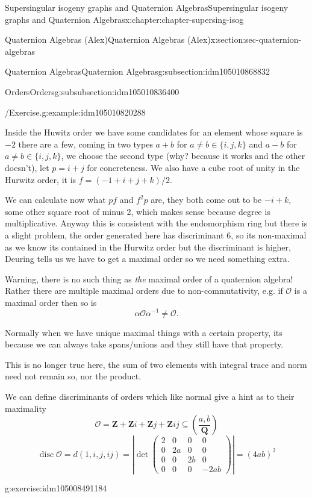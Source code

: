 \documentclass[oneside,10pt,]{book}
\numberwithin{equation}{section}
\newcommand{\inv}{^{-1}}
\newcommand{\legendre}[2]{\left(\frac{#1}{#2}\right)}
\newcommand{\ZZ}{\mathbf{Z}}
\newcommand{\QQ}{\mathbf{Q}}
\newcommand{\ints}{\mathcal{O}}
\DeclareMathOperator{\disc}{disc}
\newcommand{\amp}{&}
\begin{document}
\begin{chapterptx}{Supersingular isogeny graphs and Quaternion Algebras}{}{Supersingular isogeny graphs and Quaternion Algebras}{}{}{x:chapter:chapter-supersing-isog}
\begin{sectionptx}{Quaternion Algebras (Alex)}{}{Quaternion Algebras (Alex)}{}{}{x:section:sec-quaternion-algebras}
\begin{subsectionptx}{Quaternion Algebras}{}{Quaternion Algebras}{}{}{g:subsection:idm105010868832}
\begin{subsubsectionptx}{Orders}{}{Orders}{}{}{g:subsubsection:idm105010836400}
\begin{example}{\slash{}Exercise.}{g:example:idm105010820288}
\par
Inside the Huwitz order we have some candidates for an element whose square is \(-2\) there are a few, coming in two types \(a+ b\) for \(a \ne b \in \{i,j,k\}\) and \(a-b\) for \(a\ne b\in \{i,j,k\}\), we choose the second type (why? because it works and the other doesn't), let \(p = i + j\) for concreteness. We also have a cube root of unity in the Hurwitz order, it is \(f = (-1 + i + j + k)/2\).%
\par
We can calculate now what \(pf\) and \(f^2 p\) are, they both come out to be \(- i + k\), some other square root of minus 2, which makes sense because degree is multiplicative. Anyway this is consistent with the endomorphism ring but there is a slight problem, the order generated here has discriminant \(6\), so its non-maximal as we know its contained in the Hurwitz order but the discriminant is higher, Deuring tells us we have to get a maximal order so we need something extra.%
\end{example}
Warning, there is no such thing as \emph{the} maximal order of a quaternion algebra! Rather there are multiple maximal orders due to non-commutativity, e.g. if \(\ints\) is a maximal order then so is%
\begin{equation*}
\alpha \ints \alpha\inv \ne \ints\text{.}
\end{equation*}
%
\par
Normally when we have unique maximal things with a certain property, its because we can always take spans\slash{}unions and they still have that property.%
\par
This is no longer true here, the sum of two elements with integral trace and norm need not remain so, nor the product.%
\par
We can define discriminants of orders which like normal give a hint as to their maximality%
\begin{equation*}
\ints = \ZZ + \ZZ i + \ZZ j + \ZZ ij \subseteq \legendre{a,b}{\QQ}
\end{equation*}
%
\begin{equation*}
\disc \ints  = d(1,i,j,ij) = \left| \det\begin{pmatrix} 2 \amp 0 \amp 0\amp 0 \\ 0 \amp 2a \amp 0 \amp 0 \\ 0 \amp 0 \amp 2b \amp 0 \\ 0 \amp 0 \amp 0 \amp -2ab\end{pmatrix}\right| = (4ab)^2
\end{equation*}
%
\begin{inlineexercise}{}{g:exercise:idm105008491184}%

\end{inlineexercise}
\end{subsubsectionptx}
\end{subsectionptx}
\end{sectionptx}
\end{chapterptx}
\end{document}
